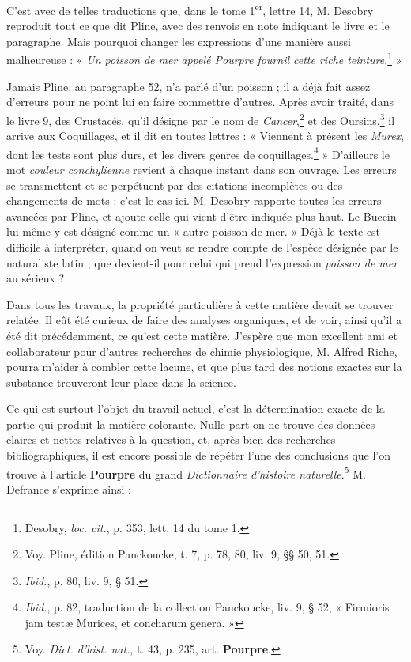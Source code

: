 \documentclass[a4paper, 11pt, oneside, polutonikogreek, french]{article}
\begin{document}
C'est avec de telles traductions que, dans le tome 1\textsuperscript{er}, lettre 14, M. Desobry reproduit tout ce que dit Pline, avec des renvois en note indiquant le livre et le paragraphe. Mais pourquoi changer les expressions d'une manière aussi malheureuse : « \emph{Un poisson de mer appelé Pourpre fournil cette riche teinture}.\footnote{Desobry, \emph{loc. cit.}, p. 353, lett. 14 du tome 1.} »

Jamais Pline, au paragraphe 52, n'a parlé d'un poisson ; il a déjà fait assez d'erreurs pour ne point lui en faire commettre d'autres. Après avoir traité, dans le livre 9, des Crustacés, qu'il désigne par le nom de \emph{Cancer},\footnote{Voy. Pline, édition Panckoucke, t. 7, p. 78, 80, liv. 9, §§ 50, 51.} et des Oursins,\footnote{\emph{Ibid.}, p. 80, liv. 9, § 51.} il arrive aux Coquillages, et il dit en toutes lettres : « Viennent à présent les \emph{Murex}, dont les tests sont plus durs, et les divers genres de coquillages.\footnote{\emph{Ibid.}, p. 82, traduction de la collection Panckoucke, liv. 9, § 52, « Firmioris jam testæ Murices, et concharum genera. »} » D'ailleurs le mot \emph{couleur conchylienne} revient à chaque instant dans son ouvrage. Les erreurs se transmettent et se perpétuent par des citations incomplètes ou des changements de mots : c'est le cas ici. M. Desobry rapporte toutes les erreurs avancées par Pline, et ajoute celle qui vient d'être indiquée plus haut. Le Buccin lui-même y est désigné comme un « autre poisson de mer. » Déjà le texte est difficile à interpréter, quand on veut se rendre compte de l'espèce désignée par le naturaliste latin ; que devient-il pour celui qui prend l'expression \emph{poisson de mer} au sérieux ?

Dans tous les travaux, la propriété particulière à cette matière devait se trouver relatée. Il eût été curieux de faire des analyses organiques, et de voir, ainsi qu'il a été dit précédemment, ce qu'est cette matière. J'espère que mon excellent ami et collaborateur pour d'autres recherches de chimie physiologique, M. Alfred Riche, pourra m'aider à combler cette lacune, et que plus tard des notions exactes sur la substance trouveront leur place dans la science.

Ce qui est surtout l'objet du travail actuel, c'est la détermination exacte de la partie qui produit la matière colorante. Nulle part on ne trouve des données claires et nettes relatives à la question, et, après bien des recherches bibliographiques, il est encore possible de répéter l'une des conclusions que l'on trouve à l'article \textbf{Pourpre} du grand \emph{Dictionnaire d'histoire naturelle}.\footnote{Voy. \emph{Dict. d'hist. nat.}, t. 43, p. 235, art. \textbf{Pourpre}.} M. Defrance s'exprime ainsi :
\end{document}
